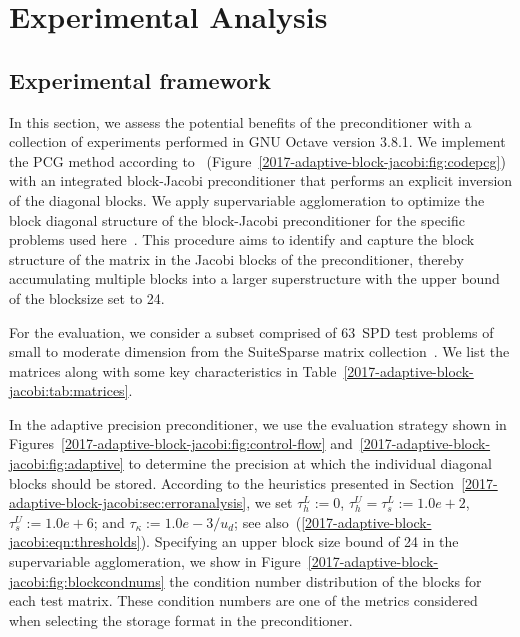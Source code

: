 \section{Experimental Analysis}
\label{2017-adaptive-block-jacobi:sec:experiments}


\subsection{Experimental framework}

In this section, we assess the potential benefits of the \apbj preconditioner
with a collection of experiments performed in GNU Octave version 3.8.1.
We implement the PCG method according
to~\cite{doi:10.1137/S1064827597323415} (Figure~\ref{2017-adaptive-block-jacobi:fig:codepcg}) with an
integrated block-Jacobi preconditioner that performs an explicit inversion of
the diagonal blocks. We apply supervariable agglomeration to optimize the block
diagonal structure of the block-Jacobi preconditioner for the specific
problems used here~\cite{jenniferscott}. This procedure aims to identify and 
capture the
block structure of the matrix in the Jacobi blocks of the preconditioner, 
thereby
accumulating multiple blocks into a larger superstructure with the upper bound
of the blocksize set to 24.

For the evaluation, we consider a subset comprised of 63~SPD test problems 
of small to moderate dimension from the SuiteSparse matrix 
collection~\cite{ufmc}. 
We list the matrices along with some key characteristics in 
Table~\ref{2017-adaptive-block-jacobi:tab:matrices}.

In the adaptive precision preconditioner, we use the evaluation strategy shown
in Figures~\ref{2017-adaptive-block-jacobi:fig:control-flow} and~\ref{2017-adaptive-block-jacobi:fig:adaptive} to determine
the precision at which the individual diagonal blocks should be stored. 
According to the heuristics presented in Section~\ref{2017-adaptive-block-jacobi:sec:erroranalysis}, we set
$\tau_h^L:= 0$, 
$\tau_h^U = \tau_s^L:=1.0e+2$, 
$\tau_s^U := 1.0e+6$; 
and $\tau_{\kappa}:=1.0e-3 /u_d$; see
also~(\ref{2017-adaptive-block-jacobi:eqn:thresholds}). Specifying an upper block size bound of 24 in the
supervariable agglomeration, we show in Figure~\ref{2017-adaptive-block-jacobi:fig:blockcondnums} the 
condition number distribution of the blocks for each test
matrix. These condition numbers are one of the metrics considered when 
selecting the storage format in the \apbj preconditioner.

